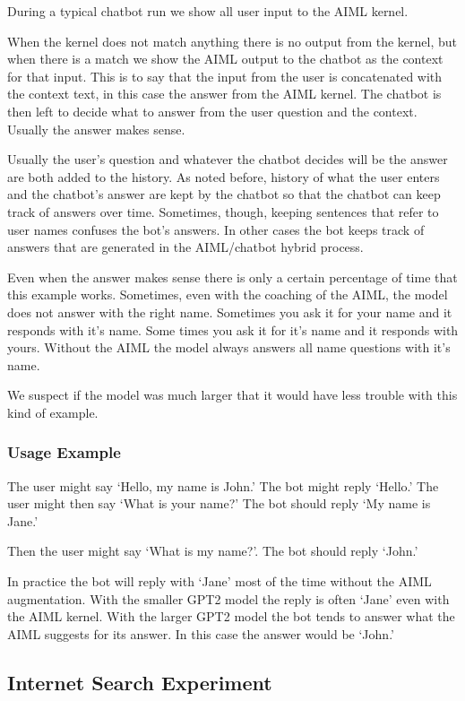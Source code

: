 During a typical chatbot run we show all user input to the AIML kernel. 

When the kernel does not match anything there is no output from the kernel, but when there is a match we show the AIML output to the chatbot as the context for that input. This is to say that the input from the user is concatenated with the context text, in this case the answer from the AIML kernel. The chatbot is then left to decide what to answer from the user question and the context. Usually the answer makes sense.

Usually the user's question and whatever the chatbot decides will be the answer are both added to the history. As noted before, history of what the user enters and the chatbot's answer are kept by the chatbot so that the chatbot can keep track of answers over time. Sometimes, though, keeping sentences that refer to user names confuses the bot's answers. In other cases the bot keeps track of answers that are generated in the AIML/chatbot hybrid process.

Even when the answer makes sense there is only a certain percentage of time that this example works. Sometimes, even with the coaching of the AIML, the model does not answer with the right name. Sometimes you ask it for your name and it responds with it's name. Some times you ask it for it's name and it responds with yours. Without the AIML the model always answers all name questions with it's name. 

We suspect if the model was much larger that it would have less trouble with this kind of example.

\subsubsection{Usage Example}

The user might say `Hello, my name is John.' The bot might reply `Hello.' The user might then say `What is your name?' The bot should reply `My name is Jane.'

Then the user might say `What is my name?'. The bot should reply `John.'

In practice the bot will reply with `Jane' most of the time without the AIML augmentation. With the smaller GPT2 model the reply is often `Jane' even with the AIML kernel. With the larger GPT2 model the bot tends to answer what the AIML suggests for its answer. In this case the answer would be `John.'

\subsection{Internet Search Experiment}

